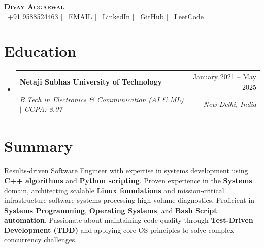 \documentclass[letterpaper, 10pt]{article}
\makeatletter
\newcommand{\resumeSubheading}[4]{
  \vspace{-2pt}\item
    \begin{tabular*}{0.97\textwidth}[t]{l@{\extracolsep{\fill}}r}
      \textbf{#1} & #2 \\
      \textit{\small#3} & \textit{\small #4} \\
    \end{tabular*}\vspace{-5pt}
}
\newcommand{\resumeSubHeadingListStart}{\begin{itemize}[leftmargin=0.05in, label={}]}
\newcommand{\resumeSubHeadingListEnd}{\end{itemize}}
\makeatother
\begin{document}
\begin{center}
    \textbf{\Huge \scshape Divay Aggarwal} \\ \vspace{5pt}
    \small
    \faPhone\ +91 9588524463 \quad $|$ \quad
    \faEnvelope\ \href{mailto:{{EMAIL}}}{\underline{{{EMAIL}}}} \quad $|$ \quad
    \faLinkedin\ \href{https://www.linkedin.com/in/divay060203/}{\underline{LinkedIn}} \quad $|$ \quad
    \faGithub\ \href{https://github.com/Ddotdeveloper}{\underline{GitHub}} \quad $|$ \quad
    \faCode\ \href{https://leetcode.com/divay_garg/}{\underline{LeetCode}}
\end{center}

\section{Education}
  \resumeSubHeadingListStart
    \resumeSubheading
      {Netaji Subhas University of Technology}{January 2021 -- May 2025}
      {B.Tech in Electronics \& Communication (AI \& ML) $|$ CGPA: 8.07}{New Delhi, India}
  \resumeSubHeadingListEnd

\section{Summary}
\small{
Results-driven Software Engineer with expertise in systems development using \textbf{C++ algorithms} and \textbf{Python scripting}. Proven experience in the \textbf{Systems} domain, architecting scalable \textbf{Linux foundations} and mission-critical infrastructure software systems processing high-volume diagnostics. Proficient in \textbf{Systems Programming}, \textbf{Operating Systems}, and \textbf{Bash Script automation}. Passionate about maintaining code quality through \textbf{Test-Driven Development (TDD)} and applying core OS principles to solve complex concurrency challenges.
}

\end{document}
